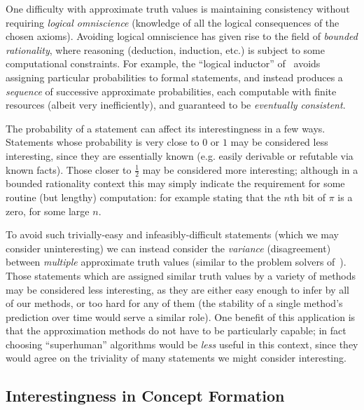 One difficulty with approximate truth values is maintaining consistency without
requiring \emph{logical omniscience} (knowledge of all the logical consequences
of the chosen axioms). Avoiding logical omniscience has given rise to the field
of \emph{bounded rationality}, where reasoning (deduction, induction, etc.) is
subject to some computational constraints. For example, the ``logical inductor''
of~\cite{garrabrant2016logical} avoids assigning particular probabilities to
formal statements, and instead produces a \emph{sequence} of successive
approximate probabilities, each computable with finite resources (albeit very
inefficiently), and guaranteed to be \emph{eventually consistent}.

The probability of a statement can affect its interestingness in a few ways.
Statements whose probability is very close to $0$ or $1$ may be considered
less interesting, since they are essentially known (e.g. easily derivable or
refutable via known facts). Those closer to $\frac{1}{2}$ may be considered more
interesting; although in a bounded rationality context this may simply indicate
the requirement for some routine (but lengthy) computation: for example stating
that the $n$th bit of $\pi$ is a zero, for some large $n$.

To avoid such trivially-easy and infeasibly-difficult statements (which we may
consider uninteresting) we can instead consider the \emph{variance}
(disagreement) between \emph{multiple} approximate truth values (similar to the
problem solvers of~\cite{fernando2013design1, fernando2013design2}). Those
statements which are assigned similar truth values by a variety of methods may
be considered less interesting, as they are either easy enough to infer by all
of our methods, or too hard for any of them (the stability of a single method's
prediction over time would serve a similar role). One benefit of this
application is that the approximation methods do not have to be particularly
capable; in fact choosing ``superhuman'' algorithms would be \emph{less} useful
in this context, since they would agree on the triviality of many statements we
might consider interesting.

\iffalse
\subsection{Interestingness in Concept Formation}
\label{sec:conceptformation}

\cite{Montano-Rivas.McCasland.Dixon.ea:2012}
\cite{Piantadosi.Tenenbaum.Goodman:2012}
\cite{Wille:2005}
\cite{colton1999automatic}
\cite{colton2000agent}
\cite{colton2012automated}
\cite{lenat1977automated}
\cite{mullerunderstanding}
\cite{Bundy.Cavallo.Dixon.ea:2015}
\cite{johansson2009isacosy}
\cite{spector2008genetic}
\cite{colton2012automated}
\cite{geng2006interestingness}

